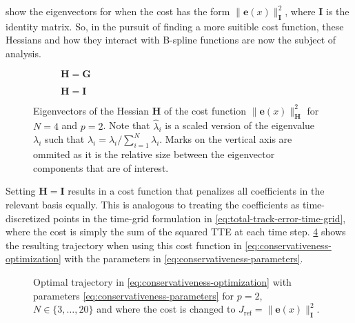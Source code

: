 show the eigenvectors for when the cost has the form $\|\mathbf e(x)\|_\mathbf I^2$, where $\mathbf I$ is the identity matrix. 
So, in the pursuit of finding a more suitible cost function, these Hessians and how they interact with B-spline functions are now the subject of analysis.


\begin{figure}
    \centering
    \begin{subfigure}{\textwidth}
        \centering
        
        \caption{$\mathbf H = \mathbf G$}
        \label{fig:conservativeness-eigenvectors-integral}
    \end{subfigure}
    \begin{subfigure}{\textwidth}
        \centering
        
        \caption{$\mathbf H = \mathbf I$}
        \label{fig:conservativeness-eigenvectors-coeffs}
    \end{subfigure}
    \caption{Eigenvectors of the Hessian $\mathbf H$ of the cost function $\|\mathbf e(x)\|_\mathbf H^2$ for $N=4$ and $p=2$. Note that $\hat\lambda_i$ is a scaled version of the eigenvalue $\lambda_i$ such that $\hat\lambda_i = \lambda_i/\sum_{i=1}^{N} \lambda_i$. Marks on the vertical axis are ommited as it is the relative size between the eigenvector components that are of interest.}
\label{fig:conservativeness-eigenvectors}
\end{figure}



Setting $\mathbf H = \mathbf I$ results in a cost function that penalizes all coefficients in the relevant basis equally. This is analogous to treating the coefficients as time-discretized points in the time-grid formulation in \cref{eq:total-track-error-time-grid}, where the cost is simply the sum of the squared TTE at each time step. \cref{fig:conservativeness-traj-coeffs} shows the resulting trajectory when using this cost function in \cref{eq:conservativeness-optimization} with the parameters in \cref{eq:conservativeness-parameters}. 

\begin{figure}
    \centering
    
    \caption{Optimal trajectory in \cref{eq:conservativeness-optimization} with parameters \cref{eq:conservativeness-parameters} for $p=2$, $N\in\{3,\ldots,20\}$ and where the cost is changed to $J_\text{ref} = \|\mathbf e(x)\|_{\mathbf I}^2$.}
    \label{fig:conservativeness-traj-coeffs}
\end{figure}


